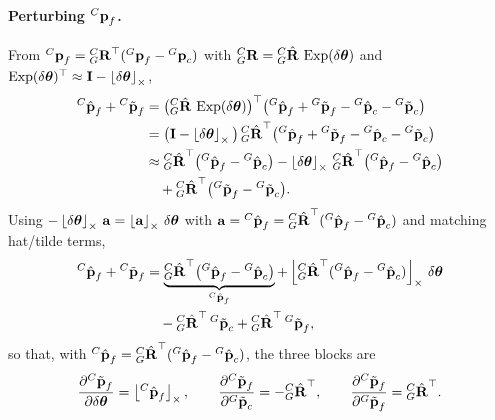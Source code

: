\paragraph{Perturbing ${}^{C}\vect{p}_f$.} From ${}^{C}\vect{p}_f = {}^{C}_{G}\vect{R}\trans({}^{G}\vect{p}_f - {}^{G}\vect{p}_c)$ with ${}^{C}_{G}\vect{R} = {}^{C}_{G}\hat{\vect{R}}\,\Exp(\delta\vect{\theta})$ and $\Exp(\delta\vect{\theta})\trans \approx \vect{I} - \skewsym{\delta\vect{\theta}}$,
\begin{align}
{}^{C}\hat{\vect{p}}_f + {}^{C}\tilde{\vect{p}}_f
&= \big({}^{C}_{G}\hat{\vect{R}}\,\Exp(\delta\vect{\theta})\big)\trans\big({}^{G}\hat{\vect{p}}_f + {}^{G}\tilde{\vect{p}}_f - {}^{G}\hat{\vect{p}}_c - {}^{G}\tilde{\vect{p}}_c\big) \\
&= \big(\vect{I} - \skewsym{\delta\vect{\theta}}\big)\,{}^{C}_{G}\hat{\vect{R}}\trans\big({}^{G}\hat{\vect{p}}_f + {}^{G}\tilde{\vect{p}}_f - {}^{G}\hat{\vect{p}}_c - {}^{G}\tilde{\vect{p}}_c\big) \\
&\approx {}^{C}_{G}\hat{\vect{R}}\trans\big({}^{G}\hat{\vect{p}}_f - {}^{G}\hat{\vect{p}}_c\big) - \skewsym{\delta\vect{\theta}}\,{}^{C}_{G}\hat{\vect{R}}\trans\big({}^{G}\hat{\vect{p}}_f - {}^{G}\hat{\vect{p}}_c\big) \notag\\
&\quad + {}^{C}_{G}\hat{\vect{R}}\trans\big({}^{G}\tilde{\vect{p}}_f - {}^{G}\tilde{\vect{p}}_c\big).
\end{align}
Using $-\skewsym{\delta\vect{\theta}}\,\vect{a} = \skewsym{\vect{a}}\,\delta\vect{\theta}$ with $\vect{a} = {}^{C}\hat{\vect{p}}_f = {}^{C}_{G}\hat{\vect{R}}\trans({}^{G}\hat{\vect{p}}_f - {}^{G}\hat{\vect{p}}_c)$ and matching hat/tilde terms,
\begin{align}
{}^{C}\hat{\vect{p}}_f + {}^{C}\tilde{\vect{p}}_f
&= \underbrace{{}^{C}_{G}\hat{\vect{R}}\trans\big({}^{G}\hat{\vect{p}}_f - {}^{G}\hat{\vect{p}}_c\big)}_{{}^{C}\hat{\vect{p}}_f}
+ \skewsym{{}^{C}_{G}\hat{\vect{R}}\trans({}^{G}\hat{\vect{p}}_f - {}^{G}\hat{\vect{p}}_c)}\,\delta\vect{\theta} \notag\\
&\quad - {}^{C}_{G}\hat{\vect{R}}\trans\,{}^{G}\tilde{\vect{p}}_c
+ {}^{C}_{G}\hat{\vect{R}}\trans\,{}^{G}\tilde{\vect{p}}_f,
\end{align}
so that, with ${}^{C}\hat{\vect{p}}_f = {}^{C}_{G}\hat{\vect{R}}\trans({}^{G}\hat{\vect{p}}_f - {}^{G}\hat{\vect{p}}_c)$, the three blocks are
\begin{align}
\frac{\partial{}^{C}\tilde{\vect{p}}_f}{\partial\delta\vect{\theta}} = \skewsym{{}^{C}\hat{\vect{p}}_f}, \qquad
\frac{\partial{}^{C}\tilde{\vect{p}}_f}{\partial{}^{G}\tilde{\vect{p}}_c} = -{}^{C}_{G}\hat{\vect{R}}\trans, \qquad
\frac{\partial{}^{C}\tilde{\vect{p}}_f}{\partial{}^{G}\tilde{\vect{p}}_f} = {}^{C}_{G}\hat{\vect{R}}\trans.
\end{align}

